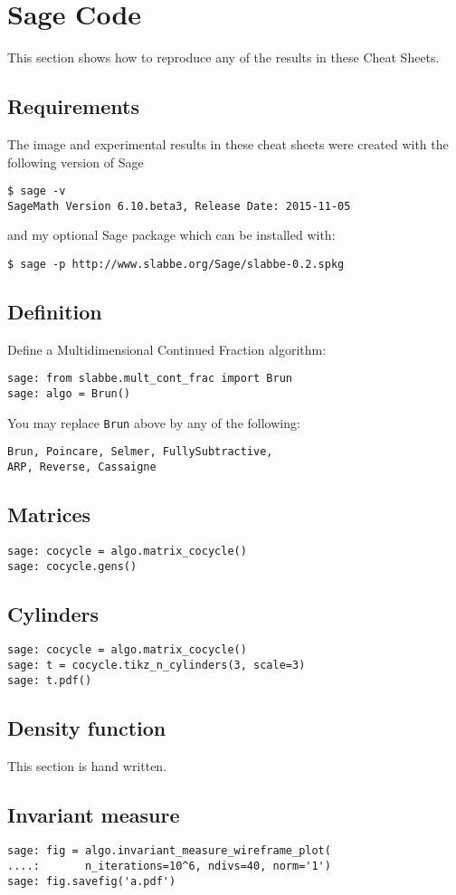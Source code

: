 \section{Sage Code}
This section shows how to reproduce any of the results in these Cheat Sheets.
\subsection{Requirements}
The image and experimental results in these cheat sheets were created with the
following version of Sage \cite{sage}
\begin{verbatim}
$ sage -v
SageMath Version 6.10.beta3, Release Date: 2015-11-05
\end{verbatim}
and my optional Sage package which can be installed with:
\begin{verbatim}
$ sage -p http://www.slabbe.org/Sage/slabbe-0.2.spkg
\end{verbatim}
\subsection{Definition}
Define a Multidimensional Continued Fraction algorithm:
\begin{verbatim}
sage: from slabbe.mult_cont_frac import Brun
sage: algo = Brun()
\end{verbatim}
You may replace \texttt{Brun} above by any of the following:
\begin{verbatim}
Brun, Poincare, Selmer, FullySubtractive, 
ARP, Reverse, Cassaigne
\end{verbatim}
\subsection{Matrices}
\begin{verbatim}
sage: cocycle = algo.matrix_cocycle()
sage: cocycle.gens()
\end{verbatim}
\subsection{Cylinders}
\begin{verbatim}
sage: cocycle = algo.matrix_cocycle()
sage: t = cocycle.tikz_n_cylinders(3, scale=3)
sage: t.pdf()
\end{verbatim}
\subsection{Density function}
This section is hand written.
\subsection{Invariant measure}
\begin{verbatim}
sage: fig = algo.invariant_measure_wireframe_plot(
....:       n_iterations=10^6, ndivs=40, norm='1')
sage: fig.savefig('a.pdf')
\end{verbatim}
